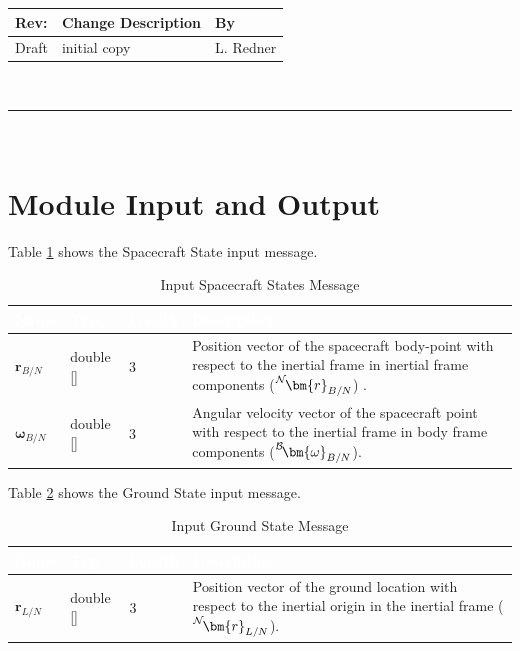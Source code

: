 \documentclass[]{AVSSimReportMemo}
\begin{document}
\makeCover


%
%
\pagestyle{empty}
{\renewcommand{\arraystretch}{2}
\noindent
\begin{longtable}{|p{0.5in}|p{4.5in}|p{1.14in}|}
\hline
{\bfseries Rev}: & {\bfseries Change Description} & {\bfseries By} \\
\hline
Draft & initial copy & L. Redner \\
\hline

\end{longtable}
}

\newpage
\setcounter{page}{1}
\pagestyle{fancy}

\tableofcontents
~\\ \hrule ~\\

\section{Module Input and Output}
Table \ref{tab:inputNavTable} shows the Spacecraft State input message.
\begin{table}[h!]
	\centering
	\caption{Input Spacecraft States Message}
	\begin{tabular}{|l|l|l|p{3in}|}
		\hline
		\rowcolor{BrickRed}
		\textcolor{white}{Name} & \textcolor{white}{Type} & 
		\textcolor{white}{Length} & 
		\textcolor{white}{Description}  \\ \hline
		$\bm{r}_{B/N}$ & double [] & 3 & 
		Position vector of the spacecraft body-point with respect to the inertial frame in inertial frame components 
		($\leftexp{N}{\bm{r}}_{B/N}$) . \\ \hline
		$\bm{\omega}_{B/N}$ & double [] & 3 & 
		Angular velocity vector of the spacecraft point with respect to the inertial frame in body frame components 
		($\leftexp{B}{\bm{\omega}}_{B/N}$). \\ \hline
	\end{tabular}
	\label{tab:inputNavTable}
\end{table}

Table \ref{tab:inputCelTable} shows the Ground State input message.
\begin{table}[h!]
	\centering
	\caption{Input Ground State Message}
	\begin{tabular}{|l|l|l|p{3in}|}
		\hline
		\rowcolor{BrickRed}
		\textcolor{white}{Name} & \textcolor{white}{Type} & 
		\textcolor{white}{Length} & 
		\textcolor{white}{Description}  \\ \hline
		$\bm{r}_{L/N}$  & double [] & 3 & 
		Position vector of the ground location with respect to the inertial origin in the inertial frame ($\leftexp{N}{\bm{r}}_{L/N}$). \\ \hline
	\end{tabular}
	\label{tab:inputCelTable}
\end{table}
\end{document}
